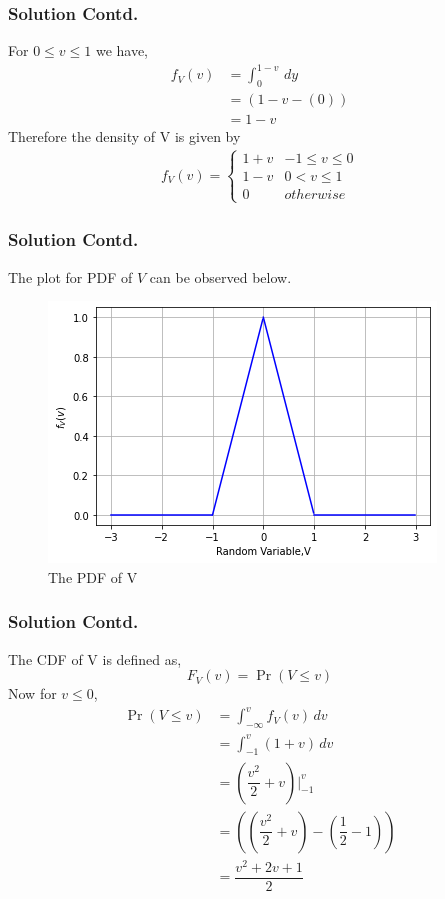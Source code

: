 \documentclass{beamer}
\providecommand{\pr}[1]{\ensuremath{\Pr\left(#1\right)}}
\begin{document}
\begin{frame}
\frametitle{Solution Contd.}
For $0 \le v \le 1$ we have, 
\begin{align}
    f_V(v) &=   \int_{0}^{1-v} \,dy  \\
          &= (1-v - (0)) \\
          &= 1-v
\end{align}
Therefore the density of V is given by
\begin{align}
\label{eq:pdf_v}
f_{V}(v)  = 
\begin{cases}
1+v & -1 \le v \le 0
\\
1-v & 0 < v \le 1
\\
0 & otherwise
\end{cases}
\end{align}
\end{frame}

\begin{frame}
\frametitle{Solution Contd.}
The plot for PDF of $V $ can be observed below.
\begin{figure}[!ht]
       \centering
    \includegraphics[scale=0.6] {Assignment_3_Fig_1.png}
    \caption{The PDF of V}
    \label{fig:The PDF of V}
\end{figure}
\end{frame}

\begin{frame}
 \frametitle{Solution Contd.}
 The CDF of V is defined as,
\begin{equation}
    F_V(v) = \pr{V \leq v}
\end{equation}
Now for $ v \le 0 $,
 \begin{align}
    \pr{V\leq v} &=  \int_{-\infty}^{v}f_{V}(v) \,dv  \\
          &=  \int_{-1}^{v} (1+v) \,dv  \\
          &=  \left(\dfrac{v^2}{2}+v \right) \Biggr|_{-1}^{v}  \\
          &=   \left(\left(\dfrac{v^2}{2}+v \right) - \left(\dfrac{1}{2} -1 \right)\right) \\
          &= \dfrac{v^2+2v +1}{2}
\end{align}
\end{frame}
\end{document}
